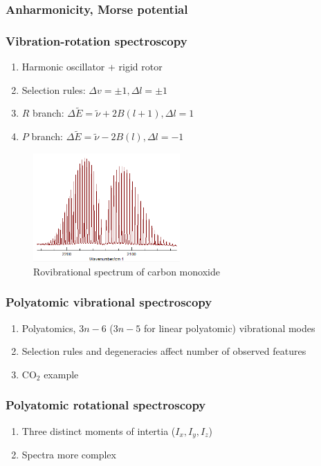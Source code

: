 \documentclass[11pt]{article}
\begin{document}
\subsubsection{Anharmonicity, Morse potential}
\label{sec:orgc9ea16a}
\subsubsection{Vibration-rotation spectroscopy}
\label{sec:org28043d3}
\begin{enumerate}
\item Harmonic oscillator + rigid rotor
\item Selection rules: \(\Delta v = \pm 1, \Delta l=\pm 1\)
\item \(R\) branch: \(\Delta \tilde E  = \tilde \nu + 2B(l+1), \Delta l = 1\)
\item \(P\) branch: \(\Delta \tilde E = \tilde \nu - 2B(l), \Delta l = -1\)
\end{enumerate}
\begin{figure}[htbp]
\centering
\includegraphics[width=0.5\textwidth]{./Images/CO-rovib.png}
\caption{Rovibrational spectrum of carbon monoxide}
\end{figure}
\subsubsection{Polyatomic vibrational spectroscopy}
\label{sec:orgcc7cb5d}
\begin{enumerate}
\item Polyatomics, \(3n-6\) (\(3n-5\) for linear polyatomic) vibrational modes
\item Selection rules and degeneracies affect number of observed features
\item CO\(_2\) example
\end{enumerate}
\subsubsection{Polyatomic rotational spectroscopy}
\label{sec:org4b84f92}
\begin{enumerate}
\item Three distinct moments of intertia (\(I_x, I_y, I_z\))
\item Spectra more complex
\end{enumerate}
\end{document}
